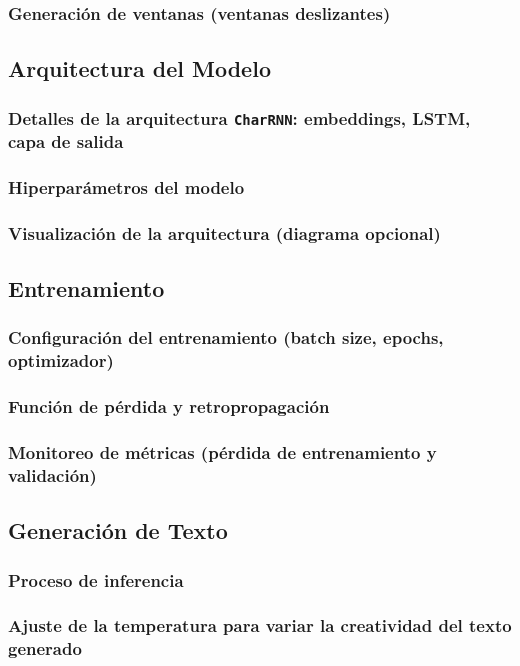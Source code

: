 \documentclass{article}
\begin{document}
\subsubsection{Generación de ventanas (ventanas deslizantes)}

\subsection{Arquitectura del Modelo}
\subsubsection{Detalles de la arquitectura \texttt{CharRNN}: embeddings, LSTM, capa de salida}
\subsubsection{Hiperparámetros del modelo}
\subsubsection{Visualización de la arquitectura (diagrama opcional)}

\subsection{Entrenamiento}
\subsubsection{Configuración del entrenamiento (batch size, epochs, optimizador)}
\subsubsection{Función de pérdida y retropropagación}
\subsubsection{Monitoreo de métricas (pérdida de entrenamiento y validación)}

\subsection{Generación de Texto}
\subsubsection{Proceso de inferencia}
\subsubsection{Ajuste de la temperatura para variar la creatividad del texto generado}
\end{document}

